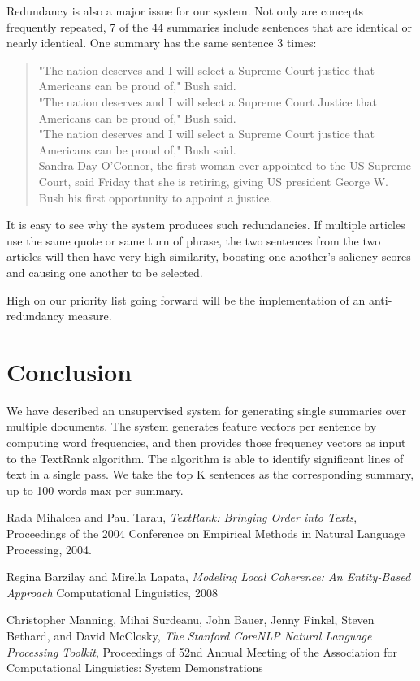 \documentclass[11pt]{article}
\begin{document}
Redundancy is also a major issue for our system. Not only are concepts frequently repeated, 7 of the 44 summaries include sentences that are identical or nearly identical. One summary has the same sentence 3 times:\\

\begin{quote}
"The nation deserves and I will select a Supreme Court justice that Americans can be proud of," Bush said.\\
"The nation deserves and I will select a Supreme Court Justice that Americans can be proud of," Bush said.\\
"The nation deserves and I will select a Supreme Court justice that Americans can be proud of," Bush said.\\
Sandra Day O'Connor, the first  woman ever appointed to the US Supreme Court, said Friday that she is retiring, giving US president George W. Bush his first  opportunity to appoint a justice.
\end{quote}

It is easy to see why the system produces such redundancies. If multiple articles use the same quote or same turn of phrase, the two sentences from the two articles will then have very high similarity, boosting one another's saliency scores and causing one another to be selected.

High on our priority list going forward will be the implementation of an anti-redundancy measure.


\section{Conclusion}
 We have described an unsupervised system for generating single summaries over multiple documents. The system generates feature vectors per sentence by computing word frequencies, and then provides those frequency vectors as input to the TextRank algorithm. The algorithm is able to identify significant lines of text in a single pass. We take the top K sentences as the corresponding summary, up to 100 words max per summary.

%
%

\begin{thebibliography}{}

	Rada Mihalcea and Paul Tarau,
	\textit{TextRank: Bringing Order into Texts},
	Proceedings of the 2004 Conference on Empirical Methods in Natural Language Processing,
	2004.

    Regina Barzilay and Mirella Lapata,
    \textit{Modeling Local Coherence: An Entity-Based Approach}
    Computational Linguistics, 
    2008

    Christopher Manning, Mihai Surdeanu, John Bauer, Jenny Finkel, Steven Bethard, and David McClosky,
    \textit{The Stanford CoreNLP Natural Language Processing Toolkit},
    Proceedings of 52nd Annual Meeting of the Association for Computational Linguistics: System Demonstrations
\end{thebibliography}
\end{document}
